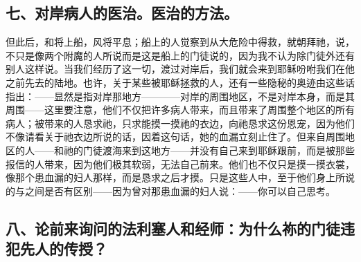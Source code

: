 
\subsection{七、对岸病人的医治。医治的方法。}

但此后，和将上船，风将平息；船上的人觉察到从大危险中得救，就朝拜祂，说，不只是像两个附魔的人所说而是这是船上的门徒说的，因为我不认为除门徒外还有别人这样说。当我们经历了这一切，渡过对岸后，我们就会来到耶稣吩咐我们在他之前先去的陆地。也许，关于某些被耶稣拯救的人，还有一些隐秘的奥迹由这些话指出：——显然是指对岸那地方————对岸的周围地区，不是对岸本身，而是其周围——这里要注意，他们不仅把许多病人带来，而且带来了周围整个地区的所有病人；被带来的人恳求祂，只求能摸一摸祂的衣边，向祂恳求这份恩宠，因为他们不像请看关于祂衣边所说的话，因着这句话，她的血漏立刻止住了。但来自周围地区的人——和祂的门徒渡海来到这地方——并没有自己来到耶稣跟前，而是被那些报信的人带来，因为他们极其软弱，无法自己前来。他们也不仅只是摸一摸衣裳，像那个患血漏的妇人那样，而是恳求之后才摸。只是这些人中，至于他们身上所说的与之间是否有区别——因为曾对那患血漏的妇人说：——你可以自己思考。\par


\subsection{八、论前来询问的法利塞人和经师：为什么祢的门徒违犯先人的传授？}


